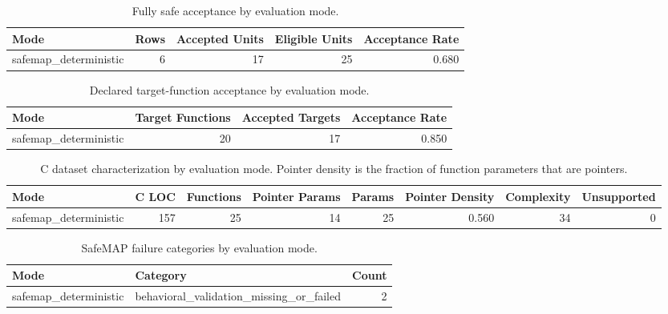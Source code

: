\begin{table}[t]
\centering
\caption{Fully safe acceptance by evaluation mode.}
\label{tab:safemap-mode-summary}
\begin{tabular}{lrrrr}
\hline
Mode & Rows & Accepted Units & Eligible Units & Acceptance Rate \\
\hline
safemap\_deterministic & 6 & 17 & 25 & 0.680 \\
\hline
\end{tabular}
\end{table}

\begin{table}[t]
\centering
\caption{Declared target-function acceptance by evaluation mode.}
\label{tab:safemap-target-summary}
\begin{tabular}{lrrr}
\hline
Mode & Target Functions & Accepted Targets & Acceptance Rate \\
\hline
safemap\_deterministic & 20 & 17 & 0.850 \\
\hline
\end{tabular}
\end{table}

\begin{table}[t]
\centering
\caption{C dataset characterization by evaluation mode. Pointer density is the fraction of function parameters that are pointers.}
\label{tab:safemap-dataset-characterization}
\begin{tabular}{lrrrrrrr}
\hline
Mode & C LOC & Functions & Pointer Params & Params & Pointer Density & Complexity & Unsupported \\
\hline
safemap\_deterministic & 157 & 25 & 14 & 25 & 0.560 & 34 & 0 \\
\hline
\end{tabular}
\end{table}

\begin{table}[t]
\centering
\caption{SafeMAP failure categories by evaluation mode.}
\label{tab:safemap-failure-summary}
\begin{tabular}{llr}
\hline
Mode & Category & Count \\
\hline
safemap\_deterministic & behavioral\_validation\_missing\_or\_failed & 2 \\
\hline
\end{tabular}
\end{table}

